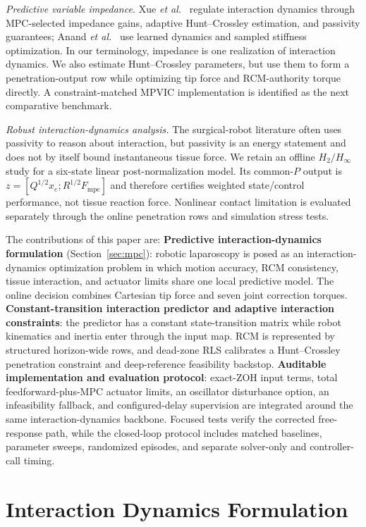 \emph{Predictive variable impedance.} Xue \emph{et al.}~\cite{roveda2025} regulate interaction dynamics through MPC-selected impedance gains, adaptive Hunt--Crossley estimation, and passivity guarantees; Anand \emph{et al.}~\cite{anand2022} use learned dynamics and sampled stiffness optimization. In our terminology, impedance is one realization of interaction dynamics. We also estimate Hunt--Crossley parameters, but use them to form a penetration-output row while optimizing tip force and RCM-authority torque directly. A constraint-matched MPVIC implementation is identified as the next comparative benchmark.

\emph{Robust interaction-dynamics analysis.} The surgical-robot literature often uses passivity to reason about interaction, but passivity is an energy statement and does not by itself bound instantaneous tissue force. We retain an offline $H_2/H_\infty$ study for a six-state linear post-normalization model. Its common-$P$ output is $z=[Q^{1/2}x_e;R^{1/2}F_{\mathrm{mpc}}]$ and therefore certifies weighted state/control performance, not tissue reaction force. Nonlinear contact limitation is evaluated separately through the online penetration rows and simulation stress tests.

The contributions of this paper are:
\textbf{Predictive interaction-dynamics formulation} (Section~\ref{sec:mpc}): robotic laparoscopy is posed as an interaction-dynamics optimization problem in which motion accuracy, RCM consistency, tissue interaction, and actuator limits share one local predictive model. The online decision combines Cartesian tip force and seven joint correction torques.
\textbf{Constant-transition interaction predictor and adaptive interaction constraints}: the predictor has a constant state-transition matrix while robot kinematics and inertia enter through the input map. RCM is represented by structured horizon-wide rows, and dead-zone RLS calibrates a Hunt--Crossley penetration constraint and deep-reference feasibility backstop.
\textbf{Auditable implementation and evaluation protocol}: exact-ZOH input terms, total feedforward-plus-MPC actuator limits, an oscillator disturbance option, an infeasibility fallback, and configured-delay supervision are integrated around the same interaction-dynamics backbone. Focused tests verify the corrected free-response path, while the closed-loop protocol includes matched baselines, parameter sweeps, randomized episodes, and separate solver-only and controller-call timing.

\section{Interaction Dynamics Formulation}\label{sec:dynamics}

